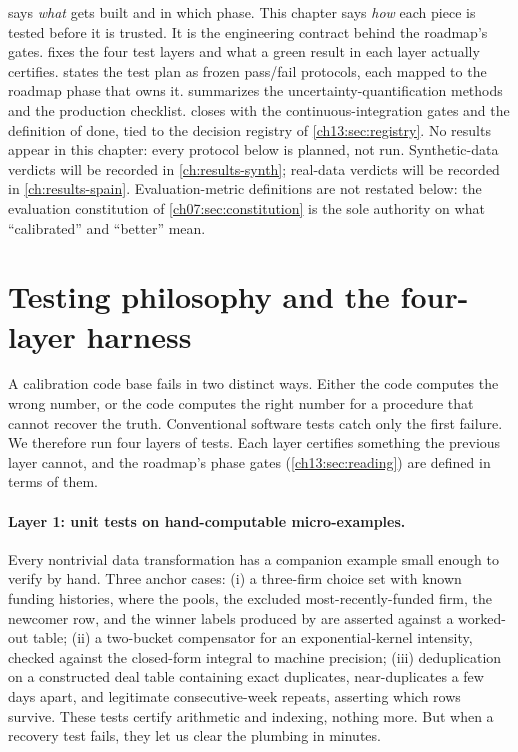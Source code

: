 
 says \emph{what} gets built and in which phase. This chapter says \emph{how} each piece is
tested before it is trusted. It is the engineering contract behind the roadmap's gates.
 fixes the four test layers and what a green result in each layer actually certifies.
 states the test plan as frozen pass/fail protocols, each mapped to the roadmap phase
that owns it.  summarizes the uncertainty-quantification methods and the production
checklist.  closes with the continuous-integration gates and the definition of done, tied
to the decision registry of \cref{ch13:sec:registry}. No results appear in this chapter: every protocol below
is planned, not run. Synthetic-data verdicts will be recorded in \cref{ch:results-synth}; real-data verdicts
will be recorded in \cref{ch:results-spain}. Evaluation-metric definitions are not restated below: the
evaluation constitution of \cref{ch07:sec:constitution} is the sole authority on what ``calibrated'' and
``better'' mean.

\section{Testing philosophy and the four-layer harness}
\label{chcp:sec:harness}

A calibration code base fails in two distinct ways. Either the code computes the wrong number, or the code
computes the right number for a procedure that cannot recover the truth. Conventional software tests catch
only the first failure. We therefore run four layers of tests. Each layer certifies something the previous
layer cannot, and the roadmap's phase gates (\cref{ch13:sec:reading}) are defined in terms of them.

\paragraph{Layer 1: unit tests on hand-computable micro-examples.} Every nontrivial data transformation has a
companion example small enough to verify by hand. Three anchor cases: (i) a three-firm choice set with known
funding histories, where the pools, the excluded most-recently-funded firm, the newcomer row, and the winner
labels produced by  are asserted against a worked-out table; (ii) a two-bucket
compensator for an exponential-kernel intensity, checked against the closed-form integral to machine
precision; (iii) deduplication on a constructed deal table containing exact duplicates, near-duplicates a few
days apart, and legitimate consecutive-week repeats, asserting which rows survive. These tests certify
arithmetic and indexing, nothing more. But when a recovery test fails, they let us clear the plumbing in
minutes.

